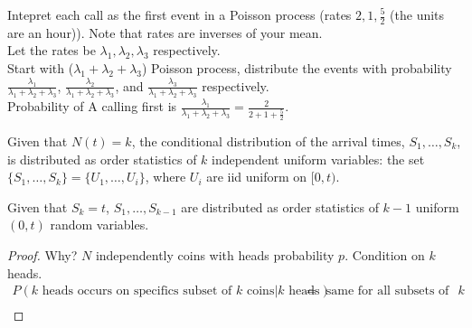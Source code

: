   \noindent Intepret each call as the first event in a Poisson process (rates
    $2, 1, \frac{5}{2}$ (the units are an hour)). Note that rates are inverses
    of your mean.\\

  \noindent Let the rates be $\lambda_1, \lambda_2, \lambda_3$ respectively.\\
    Start with ($\lambda_1 + \lambda_2 + \lambda_3$) Poisson process, distribute
    the events with probability $\frac{\lambda_1}{\lambda_1 + \lambda_2 + 
    \lambda_3}$, $\frac{\lambda_2}{\lambda_1 + \lambda_2 + \lambda_3}$, and
    $\frac{\lambda_3}{\lambda_1 + \lambda_2 + \lambda_3}$ respectively.\\
    Probability of A calling first is $\frac{\lambda_1}{\lambda_1 + \lambda_2 +
    \lambda_3} = \frac{2}{2 + 1 + \frac{5}{2}}$.\\

  \begin{theorem}
    Given that $N(t) = k$, the conditional distribution of the arrival times,
    $S_1, \ldots, S_k$, is distributed as order statistics of $k$ independent
    uniform variables: the set $\{ S_1, \ldots, S_k\} = \{U_1, \ldots, U_i\}$,
    where $U_i$ are iid uniform on $[0, t)$.\\
  \end{theorem}
  \begin{theorem}
    Given that $S_k = t$, $S_1, \ldots, S_{k - 1}$ are distributed as order 
    statistics of $k - 1$ uniform $(0, t)$ random variables.\\
  \end{theorem}
  \begin{proof}
    Why? $N$ independently coins with heads probability $p$. Condition on
    $k$ heads.\\
    \begin{eqnarray*}
      P(k \text{ heads occurs on specifics subset of $k$ coins} | \text{$k$ 
      heads}) & = & \text{same for all subsets of size $k$}\\
    \end{eqnarray*}
  \end{proof}

